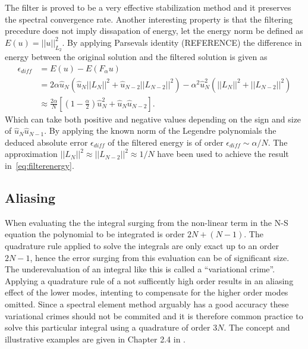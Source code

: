 The filter is proved to be a very effective stabilization method and it preserves the 
spectral convergence rate. Another interesting property is that the filtering precedure 
does not imply dissapation of energy, let the energy norm be defined as $E(u) = ||u||_{L_2}^2$.  
By applying Parsevals identity (REFERENCE) the difference in energy between the original solution
and the filtered solution is given as 
\begin{align}
   \epsilon_{diff}&=E(u) - E(F_{\alpha}u) \\
                &= 2\alpha\hat{u}_N(\hat{u}_N||L_N||^2+\hat{u}_{N-2}||L_{N-2}||^2)
    - \alpha^2\hat{u}^2_N(||L_N||^2+||L_{N-2}||^2)\\
    &\approx \frac{2\alpha}{N}\left[  (1-\frac{\alpha}{2})\hat{u}_N^2 + 
    \hat{u}_N\hat{u}_{N-2}\right].
    \label{eq:filterenergy}
\end{align}
Which can take both positive and negative values depending on the sign and size of
$\hat{u}_N\hat{u}_{N-1}$. By applying the known norm of the Legendre polynomials 
the deduced absolute error $\epsilon_{diff}$ of the filtered energy is of order 
$\epsilon_{diff}\sim \alpha/N$. The approximation $||L_N||^2\approx||L_{N-2}||^2\approx 1/N$
have been used to achieve the result in~\ref{eq:filterenergy}.
\subsection{Aliasing}
When evaluating the the integral surging from the non-linear term in the N-S equation 
the polynomial to be integrated is order $2N+(N-1)$. The quadrature rule applied to solve the 
integrals are only exact up to an order $2N-1$, hence the error surging from this evaluation 
can be of significant size. The underevaluation of an integral like this is called a ``variational
crime''. Applying a quadrature rule of a not sufficently high order results in an 
aliasing effect of the lower modes, intenting to compensate for the higher order modes omitted. 
Since a spectral element method arguably has a good accuracy these variational crimes should 
not be commited and it is therefore common practice to solve this particular integral using a
quadrature of order $3N$. The concept and illustrative examples are given in Chapter 2.4 in 
\cite{Karniadakis}.


